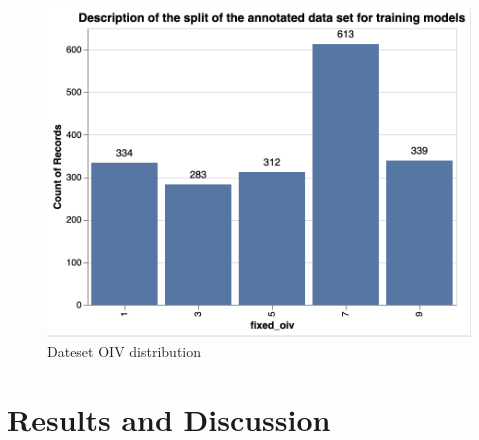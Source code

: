 \documentclass[english]{article}
\begin{document}
\begin{figure}[H]
    \begin{center}
        \includegraphics[width=0.7\linewidth]{2023_a_oiv_oiv_distribution}
        \caption{Dateset OIV distribution}\label{fig:datadistribution}
    \end{center}
\end{figure}


\section{Results and Discussion}
\end{document}
